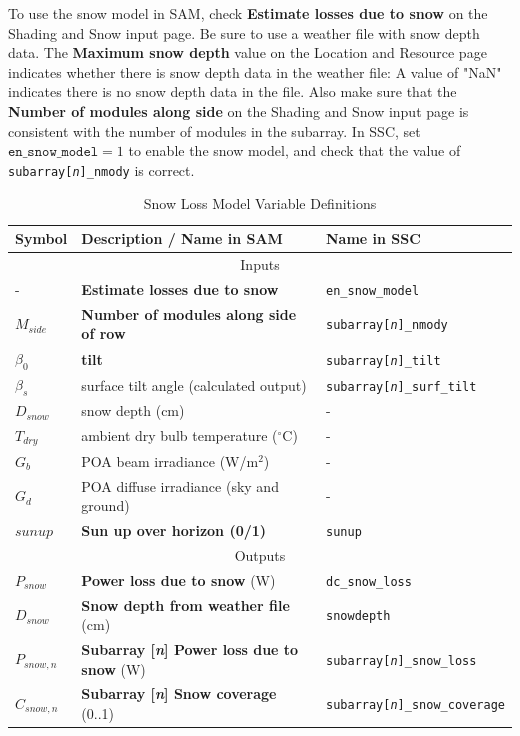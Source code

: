 \documentclass[12pt,letterpaper]{article}
\begin{document}
To use the snow model in SAM, check \textbf{Estimate losses due to snow} on the Shading and Snow input page. Be sure to use a weather file with snow depth data. The \textbf{Maximum snow depth} value on the Location and Resource page indicates whether there is snow depth data in the weather file: A value of "NaN" indicates there is no snow depth data in the file. Also make sure that the \textbf{Number of modules along side} on the Shading and Snow input page is consistent with the number of modules in the subarray. In SSC, set $\texttt{en\_snow\_model} = 1$ to enable the snow model, and check that the value of \texttt{subarray[\textit{n}]\_nmody} is correct.

\begin{table}
\begin{center}
\caption{Snow Loss Model Variable Definitions}
\begin{tabular}{lll}
\midrule
Symbol & Description / \textbf{Name in SAM} & Name in SSC \\
\midrule
\multicolumn{3}{c}{Inputs}\\
- & \textbf{Estimate losses due to snow} & \texttt{en\_snow\_model} \\
$M_{side}$ & \textbf{Number of modules along side of row} &  \texttt{subarray[\textit{n}]\_nmody}\\
$\beta_0$ & \textbf{tilt} & \texttt{subarray[\textit{n}]\_tilt}\\
$\beta_s$ & surface tilt angle (calculated output) & \texttt{subarray[\textit{n}]\_surf\_tilt}\\
$D_{snow}$ & snow depth (cm) & - \\
$T_{dry}$ & ambient dry bulb temperature ($^\circ$C) & - \\
$G_{b}$ & POA beam irradiance (W/m$^2$)& - \\
$G_{d}$ & POA diffuse irradiance (sky and ground) & - \\
$\mathit{sunup}$ & \textbf{Sun up over horizon (0/1)} & \texttt{sunup} \\
\midrule
\multicolumn{3}{c}{Outputs}\\
$P_{snow}$ & \textbf{Power loss due to snow} (W) & \texttt{dc\_snow\_loss} \\
$D_{snow}$ & \textbf{Snow depth from weather file} (cm) & \texttt{snowdepth} \\
$P_{snow,n}$ & \textbf{Subarray [\textit{n}] Power loss due to snow} (W) &  \texttt{subarray[\textit{n}]\_snow\_loss} \\
$C_{snow,n}$ & \textbf{Subarray [\textit{n}] Snow coverage} (0..1) &  \texttt{subarray[\textit{n}]\_snow\_coverage} \\
\hline
\end{tabular}
\label{tab-snowvars}
\end{center}
\end{table}
\end{document}
